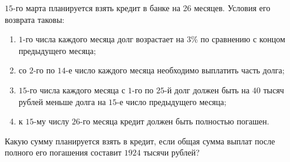 
\begin{tcolorbox}[
    colback=blue!5!white,
    colframe=blue!75!black,
    title=Задание 1.1
  ]

  $15$-го марта планируется взять кредит в банке на 26 месяцев. Условия его возврата таковы:

  \begin{enumerate}[--]
    \item $1$-го числа каждого месяца долг возрастает на $3$\% по сравнению с концом предыдущего месяца;
    \item со $2$-го по $14$-е число каждого месяца необходимо выплатить часть долга;
    \item $15$-го числа каждого месяца с $1$-го по $25$-й долг должен быть на $40$ тысяч рублей меньше долга на $15$-е число предыдущего месяца;
    \item к $15$-му числу $26$-го месяца кредит должен быть полностью погашен.
  \end{enumerate}

  Какую сумму планируется взять в кредит, если общая сумма выплат после полного его погашения составит $1924$ тысячи рублей?

\end{tcolorbox}

